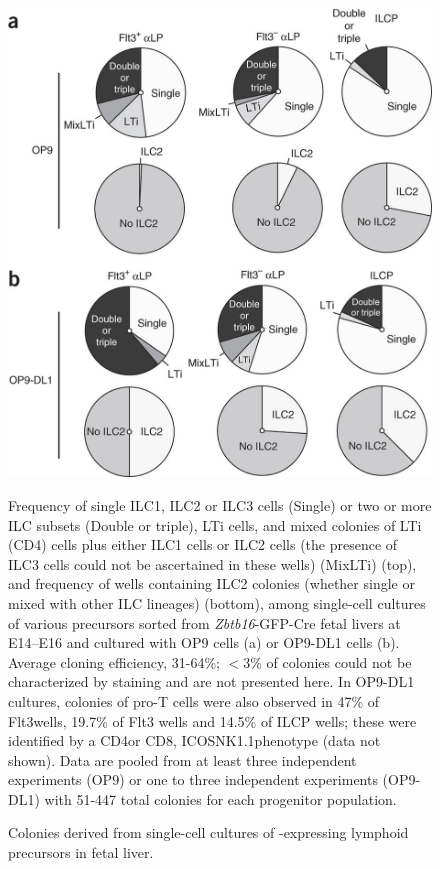 \begin{figure}[p]
\begin{center}
	\includegraphics[height=0.5\textheight]{figures/chapter3/F2}
\end{center}
	\caption{Colonies derived from single-cell cultures of \ab-expressing lymphoid precursors in fetal liver.} 
	Frequency of single ILC1, ILC2 or ILC3 cells (Single) or two or more ILC subsets (Double or triple), LTi cells, and mixed colonies of LTi (CD4\UP) cells plus either ILC1 cells or ILC2 cells (the presence of ILC3 cells could not be ascertained in these wells) (MixLTi) (top), and frequency of wells containing ILC2 colonies (whether single or mixed with other ILC lineages) (bottom), among single-cell cultures of various precursors sorted from \textit{Zbtb16}-GFP-Cre fetal livers at E14–E16 and cultured with OP9 cells (a) or OP9-DL1 cells (b). Average cloning efficiency, 31-64\%; $<$3\% of colonies could not be characterized by staining and are not presented here. In OP9-DL1 cultures, colonies of pro-T cells were also observed in 47\% of Flt3\UP \aLP wells, 19.7\% of Flt3\UM{} \aLP wells and 14.5\% of ILCP wells; these were identified by a CD4\UP or CD8\UP, ICOS\UM \ab\UM NK1.1\UM phenotype (data not shown). Data are pooled from at least three independent experiments (OP9) or one to three independent experiments (OP9-DL1) with 51-447 total colonies for each progenitor population.
	\label{fig:chap3_F2}
\end{figure}

